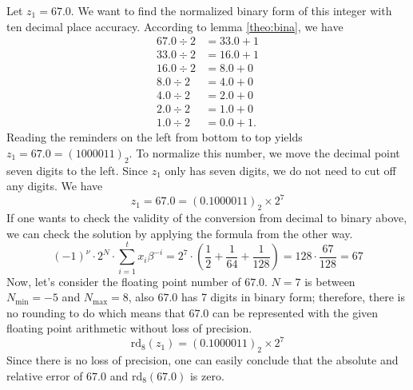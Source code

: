 \begin{exmp}\label{exmp:z1}
    Let \(z_1 = 67.0\). We want to find the normalized binary form of this integer with ten decimal place accuracy. According to lemma \ref{theo:bina}, we have
    \begin{align*}
        67.0 \div 2 &= 33.0 + 1 \\
        33.0 \div 2 &= 16.0 + 1 \\
        16.0 \div 2 &= 8.0 + 0 \\
        8.0 \div 2 &= 4.0 + 0 \\
        4.0 \div 2 &= 2.0 + 0 \\
        2.0 \div 2 &= 1.0 + 0 \\
        1.0 \div 2 &= 0.0 + 1 \text{.}
    \end{align*}
    Reading the reminders on the left from bottom to top yields \(z_1 = 67.0 = (1000011)_2\). To normalize this number, we move the decimal point seven digits to the left. Since \(z_1\) only has seven digits, we do not need to cut off any digits. We have
    \begin{equation*}
        z_1 = 67.0 = (0.1000011)_2 \times 2^7
    \end{equation*}
    If one wants to check the validity of the conversion from decimal to binary above, we can check the solution by applying the formula from the other way.
    \begin{equation*}
        (-1)^{\nu} \cdot 2^N \cdot \sum_{i=1}^{t}x_i \beta^{-i} = 2^7 \cdot \left(\frac{1}{2} + \frac{1}{64} + \frac{1}{128}\right) = 128 \cdot \frac{67}{128} = 67
    \end{equation*}
    Now, let's consider the floating point number of \(67.0\). \(N = 7\) is between \(N_{\text{min}} = -5\) and \(N_{\text{max}} = 8\), also \(67.0\) has 7 digits in binary form; therefore, there is no rounding to do which means that \(67.0\) can be represented with the given floating point arithmetic without loss of precision.
    \begin{equation*}
        \text{rd}_8(z_1) = (0.1000011)_2 \times 2^7
    \end{equation*}
    Since there is no loss of precision, one can easily conclude that the absolute and relative error of \(67.0\) and \(\text{rd}_8(67.0)\) is zero.
\end{exmp}
%
%
